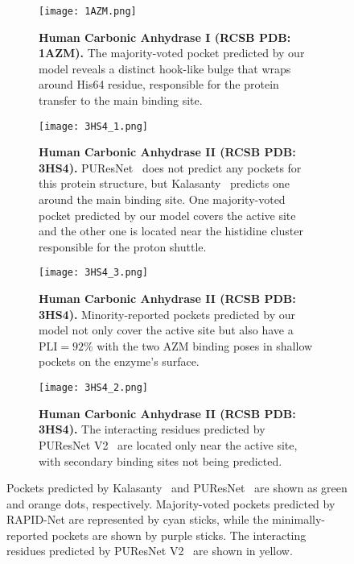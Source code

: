 \documentclass[10pt,conference]{IEEEtran}
\begin{document}
\begin{figure*}[]
  \centering
  \begin{subfigure}[b]{0.48\textwidth}
    \texttt{[image: 1AZM.png]}
    \caption{\textbf{Human Carbonic Anhydrase I (RCSB PDB: 1AZM).} The majority-voted pocket predicted by our model reveals a distinct hook-like bulge that wraps around His64 residue, responsible for the protein transfer to the main binding site.}
    \label{1AZM_Fig}
  \end{subfigure}
  \hfill
  \begin{subfigure}[b]{0.48\textwidth}
    \texttt{[image: 3HS4\_1.png]}
    \caption{\textbf{Human Carbonic Anhydrase II (RCSB PDB: 3HS4).} PUResNet~\cite{kandel2021puresnet} does not predict any pockets for this protein structure, but Kalasanty~\cite{stepniewska2020improving} predicts one around the main binding site. One majority-voted pocket predicted by our model covers the active site and the other one is located near the histidine cluster responsible for the proton shuttle.}
    \label{3HS4_1_Fig}
  \end{subfigure}
    \begin{subfigure}[b]{0.48\textwidth}
    \texttt{[image: 3HS4\_3.png]}
    \caption{\textbf{Human Carbonic Anhydrase II (RCSB PDB: 3HS4).} Minority-reported pockets predicted by our model not only cover the active site but also have a $\text{PLI} = 92\%$ with the two AZM binding poses in shallow pockets on the enzyme's surface.}
    \label{3HS4_3_Fig}
  \end{subfigure}
  \hfill
  \begin{subfigure}[b]{0.48\textwidth}
    \texttt{[image: 3HS4\_2.png]}
    \caption{\textbf{Human Carbonic Anhydrase II (RCSB PDB: 3HS4).} The interacting residues predicted by PUResNet V2~\cite{jeevan2024puresnetv2} are located only near the active site, with secondary binding sites not being predicted.}
    \label{3HS4_2_Fig}
  \end{subfigure}
  \caption{Pockets predicted by Kalasanty~\cite{stepniewska2020improving} and PUResNet~\cite{kandel2021puresnet} are shown as green and orange dots, respectively. Majority-voted pockets predicted by RAPID-Net are represented by cyan sticks, while the minimally-reported pockets are shown by purple sticks. The interacting residues predicted by PUResNet V2~\cite{jeevan2024puresnetv2} are shown in yellow.}
  \label{combined_fig}
\end{figure*}
\end{document}
